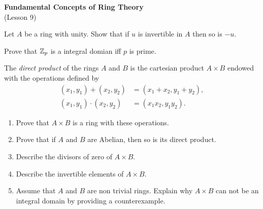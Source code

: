 \documentclass[
    11pt,a4paper,
]{exam}
\begin{document}
\def\contador{Problem Set 4}


\begin{center}
    {\bfseries\Large
        Fundamental Concepts of Ring Theory}\\
    (Lesson 9)
\end{center}


\begin{questions}

\question
Let $A$ be a ring with unity. Show that if $u$ is invertible in $A$ then so is $-u$.


\question
 Prove that   $\mathbb{Z}_p$ is a integral domian iff $p$ is prime.

  
\question
The \emph{direct product} of the rings $A$ and $B$ is the cartesian product $A\times B$ endowed with the operations defined by
\begin{align*}
(x_1,y_1) + (x_2,y_2) &= (x_1+x_2, y_1+y_2),
\\
(x_1,y_1) \cdot (x_2,y_2) &= (x_1 x_2, y_1 y_2).
\end{align*}
\begin{enumerate}[label=(\roman*)]
\item Prove that $A\times B$ is a ring with these operations.
\item Prove that if $A$ and $B$ are Abelian, then so is its direct product.
\item Describe the divisors of zero of $A\times B$.
\item Describe the invertible elements of $A\times B$.
\item Assume that $A$ and $B$ are non trivial rings. Explain why $A\times B$ can not be an integral domain by providing a counterexample.
\end{enumerate}





\end{questions}
\end{document}
